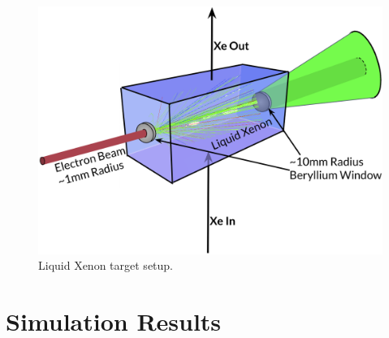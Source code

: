 \documentclass[%
reprint,
nofootinbib,
amsmath, amssymb,
aps,
floatfix,
]{revtex4-2}
\begin{document}
\begin{figure}[H]
    \includegraphics[width = \linewidth]{../images/Schematic4.png}
    \caption{\label{fig:schem}Liquid Xenon target setup.}
\end{figure}

\section{Simulation Results}



\end{document}

